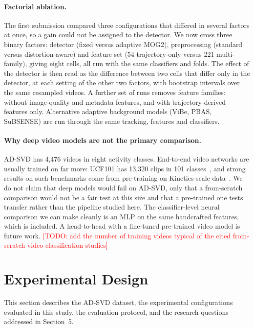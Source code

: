 \documentclass[runningheads]{llncs}
\newcommand{\todo}[1]{\textcolor{red}{[TODO: #1]}}
\begin{document}
\paragraph{Factorial ablation.}

The first submission compared three configurations that differed in several factors at once, so a gain 
could not be assigned to the detector. We now cross three binary factors: detector (fixed versus adaptive 
MOG2), preprocessing (standard versus distortion-aware) and feature set (54 trajectory-only versus 221 
multi-family), giving eight cells, all run with the same classifiers and folds. The effect of the detector 
is then read as the difference between two cells that differ only in the detector, at each setting of the 
other two factors, with bootstrap intervals over the same resampled videos. 
A further set of runs removes feature families: without image-quality and metadata features, and with 
trajectory-derived features only. Alternative adaptive background models (ViBe, PBAS, SuBSENSE) are 
run through the same tracking, features and classifiers.

\paragraph{Why deep video models are not the primary comparison.}

AD-SVD has 4,476 videos in eight activity classes. End-to-end video networks are usually trained on 
far more: UCF101 has 13,320 clips in 101 classes~\cite{soomro2012ucf101}, and strong results on such 
benchmarks come from pre-training on Kinetics-scale data~\cite{carreira2017quo}. We do not claim that 
deep models would fail on AD-SVD, only that a from-scratch comparison would not be a fair test at this 
size and that a pre-trained one tests transfer rather than the pipeline studied here. The classifier-level 
neural comparison we can make cleanly is an MLP on the same handcrafted features, which is included. 
A head-to-head with a fine-tuned pre-trained video model is future work.
\todo{add the number of training videos typical of the cited from-scratch video-classification studies}

\section{Experimental Design}

This section describes the AD-SVD dataset, the experimental
configurations evaluated in this study, the evaluation protocol, and the
research questions addressed in Section~5.
\end{document}
